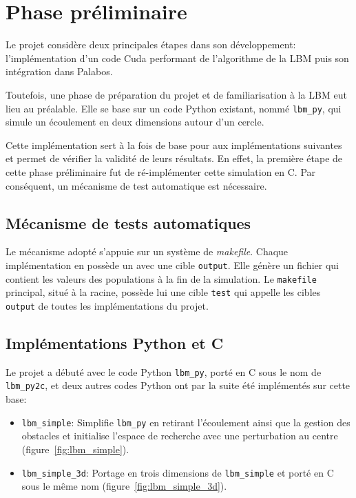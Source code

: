 \section{Phase préliminaire}
Le projet considère deux principales étapes dans son développement: l'implémentation d'un code Cuda performant de l'algorithme de la \ac{LBM} puis son intégration dans Palabos.

Toutefois, une phase de préparation du projet et de familiarisation à la \ac{LBM} eut lieu au préalable. Elle se base sur un code Python existant, nommé \texttt{lbm\_py}, qui simule un écoulement en deux dimensions autour d'un cercle. 

Cette implémentation sert à la fois de base pour aux implémentations suivantes et permet de vérifier la validité de leurs résultats. En effet, la première étape de cette phase préliminaire fut de ré-implémenter cette simulation en C. Par conséquent, un mécanisme de test automatique est nécessaire.

\subsection{Mécanisme de tests automatiques} \label{title-tests}

Le mécanisme adopté s'appuie sur un système de \textit{makefile}. Chaque implémentation en possède un avec une cible \texttt{output}. Elle génère un fichier qui contient les valeurs des populations à la fin de la simulation. Le \texttt{makefile} principal, situé à la racine, possède lui une cible \texttt{test} qui appelle les cibles \texttt{output} de toutes les implémentations du projet.

\subsection{Implémentations Python et C}  \label{title-implementation_python_C}

Le projet a débuté avec le code Python \texttt{lbm\_py}, porté en C sous le nom de \texttt{lbm\_py2c}, et deux autres codes Python ont par la suite été implémentés sur cette base:
\begin{itemize}
\item \texttt{lbm\_simple}: Simplifie \texttt{lbm\_py} en retirant l'écoulement ainsi que la gestion des obstacles et initialise l'espace de recherche avec une perturbation au centre (figure~\ref{fig:lbm_simple}). 
\item \texttt{lbm\_simple\_3d}: Portage en trois dimensions de \texttt{lbm\_simple} et porté en C sous le même nom (figure~\ref{fig:lbm_simple_3d}). 
\end{itemize}

